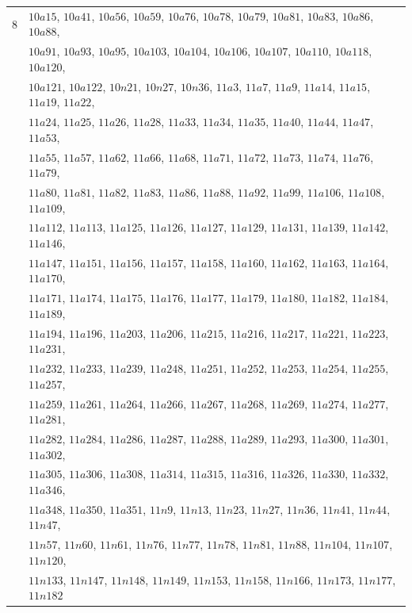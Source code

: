 \documentclass[pdftex, a4paper, 12pt, oneside]{amsart}
\numberwithin{equation}{section}
\theoremstyle{plain}
\theoremstyle{definition}
\begin{document}
\begin{footnotesize}
\begin{center}
\begin{longtable}[ht]{r||l}
				
				\\
				\hline
				$8$& $10a15$,
				$10a41$,
				$10a56$,
				$10a59$,
				$10a76$,
				$10a78$,
				$10a79$,
				$10a81$,
				$10a83$,
				$10a86$,
				$10a88$,\\&
				$10a91$,
				$10a93$,
				$10a95$,
				$10a103$,
				$10a104$,
				$10a106$,
				$10a107$,
				$10a110$,
				$10a118$,
				$10a120$,\\&
				$10a121$,
				$10a122$,
				$10n21$,
				$10n27$,
				$10n36$, 
				$11a3$,
				$11a7$,
				$11a9$,
				$11a14$,
				$11a15$,
				$11a19$,
				$11a22$,\\&
				$11a24$,
				$11a25$,
				$11a26$,
				$11a28$,
				$11a33$,
				$11a34$,
				$11a35$,
				$11a40$,
				$11a44$,
				$11a47$,
				$11a53$,\\&
				$11a55$,
				$11a57$,
				$11a62$,
				$11a66$,
				$11a68$,
				$11a71$,
				$11a72$,
				$11a73$,
				$11a74$,
				$11a76$,
				$11a79$,\\&
				$11a80$,
				$11a81$,
				$11a82$,
				$11a83$,
				$11a86$,
				$11a88$,
				$11a92$,
				$11a99$,
				$11a106$,
				$11a108$,
				$11a109$,\\&
				$11a112$,
				$11a113$,
				$11a125$,
				$11a126$,
				$11a127$,
				$11a129$,
				$11a131$,
				$11a139$,
				$11a142$,
				$11a146$,\\&
				$11a147$,
				$11a151$,
				$11a156$,
				$11a157$,
				$11a158$,
				$11a160$,
				$11a162$,
				$11a163$,
				$11a164$,
				$11a170$,\\&
				$11a171$,
				$11a174$,
				$11a175$,
				$11a176$,
				$11a177$,
				$11a179$,
				$11a180$,
				$11a182$,
				$11a184$,
				$11a189$,\\&
				$11a194$,
				$11a196$,
				$11a203$,
				$11a206$,
				$11a215$,
				$11a216$,
				$11a217$,
				$11a221$,
				$11a223$,
				$11a231$,\\&
				$11a232$,
				$11a233$,
				$11a239$,
				$11a248$,
				$11a251$,
				$11a252$,
				$11a253$,
				$11a254$,
				$11a255$,
				$11a257$,\\&
				$11a259$,
				$11a261$,
				$11a264$,
				$11a266$,
				$11a267$,
				$11a268$,
				$11a269$,
				$11a274$,
				$11a277$,
				$11a281$,\\&
				$11a282$,
				$11a284$,
				$11a286$,
				$11a287$,
				$11a288$,
				$11a289$,
				$11a293$,
				$11a300$,
				$11a301$,
				$11a302$,\\&
				$11a305$,
				$11a306$,
				$11a308$,
				$11a314$,
				$11a315$,
				$11a316$,
				$11a326$,
				$11a330$,
				$11a332$,
				$11a346$,\\&
				$11a348$,
				$11a350$,
				$11a351$,
				$11n9$,
				$11n13$,
				$11n23$,
				$11n27$,
				$11n36$,
				$11n41$,
				$11n44$,
				$11n47$,\\&
				$11n57$,
				$11n60$,
				$11n61$,
				$11n76$,
				$11n77$,
				$11n78$,
				$11n81$,
				$11n88$,
				$11n104$,
				$11n107$,
				$11n120$,\\&
				$11n133$,
				$11n147$,
				$11n148$,
				$11n149$,
				$11n153$,
				$11n158$,
				$11n166$,
				$11n173$,
				$11n177$,
				$11n182$
				

\end{longtable}
\end{center}
\end{footnotesize}
\end{document}
